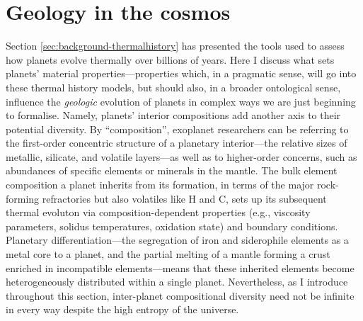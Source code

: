 \section{Geology in the cosmos}
\label{sec:background-composition}
Section \ref{sec:background-thermalhistory} has presented the tools used to assess how planets evolve thermally over billions of years. Here I discuss what sets planets' material properties---properties which, in a pragmatic sense, will go into these thermal history models, but should also, in a broader ontological sense, influence the \textit{geologic} evolution of planets in complex ways we are just beginning to formalise. Namely, planets' interior compositions add another axis to their potential diversity. By ``composition'', exoplanet researchers can be referring to the first-order concentric structure of a planetary interior---the relative sizes of metallic, silicate, and volatile layers---as well as to higher-order concerns, such as abundances of specific elements or minerals in the mantle. The bulk element composition a planet inherits from its formation, in terms of the major rock-forming refractories but also volatiles like H and C, sets up its subsequent thermal evoluton via composition-dependent properties (e.g., viscosity parameters, solidus temperatures, oxidation state) and boundary conditions. Planetary differentiation---the segregation of iron and siderophile elements as a metal core to a planet, and the partial melting of a mantle forming a crust enriched in incompatible elements---means that these inherited elements become heterogeneously distributed within a single planet. Nevertheless, as I introduce throughout this section, inter-planet compositional diversity need not be infinite in every way despite the high entropy of the universe.

